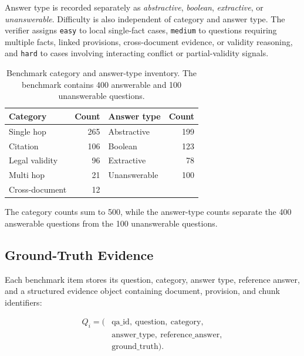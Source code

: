 Answer type is recorded separately as \textit{abstractive}, \textit{boolean}, \textit{extractive}, or \textit{unanswerable}. Difficulty is also independent of category and answer type.
The verifier assigns \texttt{easy} to local single-fact cases, \texttt{medium} to questions requiring multiple facts, linked provisions, cross-document evidence, or validity reasoning, and \texttt{hard} to cases involving interacting conflict or partial-validity signals.

\begin{table}[t]
\centering
\scriptsize
\caption{Benchmark category and answer-type inventory. The benchmark contains 400 answerable and 100 unanswerable questions.}
\label{tab:benchmark-taxonomy}

\begin{tabular}{lr|lr}
\toprule
\textbf{Category} & \textbf{Count} & \textbf{Answer type} & \textbf{Count} \\
\midrule
Single hop & 265 & Abstractive & 199 \\
Citation & 106 & Boolean & 123 \\
Legal validity & 96 & Extractive & 78 \\
Multi hop & 21 & Unanswerable & 100 \\
Cross-document & 12 & & \\
\bottomrule
\end{tabular}
\end{table}

The category counts sum to 500, while the answer-type counts separate the 400 answerable questions from the 100 unanswerable questions.
\subsection{Ground-Truth Evidence}
\label{sec:ground-truth}

Each benchmark item stores its question, category, answer type, reference answer, and a structured evidence object containing document, provision, and chunk identifiers:

\begin{equation}
\begin{aligned}
Q_i = \bigl(&\mathrm{qa\_id},\ \mathrm{question},\ \mathrm{category},\\
             &\mathrm{answer\_type},\ \mathrm{reference\_answer},\\
             &\mathrm{ground\_truth}\bigr).
\end{aligned}
\end{equation}

